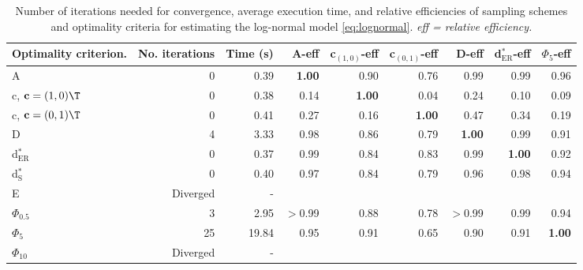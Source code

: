 \begin{table}[htb!]
\centering
\caption{Number of iterations needed for convergence, average execution time, and relative efficiencies of sampling schemes and optimality criteria for estimating the log-normal model \eqref{eq:lognormal}. \textit{eff = relative efficiency.}} 
\label{tab:baseline_impact_speed}
\begin{tabular}{lrrrrrrrr}
 Optimality criterion. & No. iterations & Time (s) & A-eff & c$_{(1,0)}$-eff & c$_{(0,1)}$-eff & D-eff & d$^*_{\mathrm{ER}}$-eff & $\Phi_5$-eff \\ 
  \hline
A & 0 & 0.39 & \textbf{1.00} & 0.90 & 0.76 & 0.99 & 0.99 & 0.96 \\ 
  c, $\mathbf{c} = (1,0)\T$ & 0 & 0.38 & 0.14 & \textbf{1.00} & 0.04 & 0.24 & 0.10 & 0.09 \\ 
  c, $\mathbf{c} = (0,1)\T$ & 0 & 0.41 & 0.27 & 0.16 & \textbf{1.00} & 0.47 & 0.34 & 0.19 \\ 
  D & 4 & 3.33 & 0.98 & 0.86 & 0.79 & \textbf{1.00} & 0.99 & 0.91 \\ 
  d$^*_{\mathrm{ER}}$ & 0 & 0.37 & 0.99 & 0.84 & 0.83 & 0.99 & \textbf{1.00} & 0.92 \\ 
  d$^*_{\mathrm{S}}$ & 0 & 0.40 & 0.97 & 0.84 & 0.79 & 0.96 & 0.98 & 0.94 \\ 
  E & Diverged & - &  &  &  &  &  &  \\ 
  $\Phi_{0.5}$ & 3 & 2.95 & $>$0.99 & 0.88 & 0.78 & $>$0.99 & 0.99 & 0.94 \\ 
  $\Phi_5$ & 25 & 19.84 & 0.95 & 0.91 & 0.65 & 0.90 & 0.91 & \textbf{1.00} \\ 
  $\Phi_{10}$ & Diverged & - &  &  &  &  &  &  \\ 
   \hline
\end{tabular}
\end{table}
